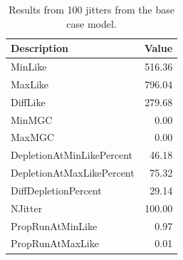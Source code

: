 \documentclass[12pt,]{article}
\begin{document}
\FloatBarrier

\begin{table}[ht]
\centering
\caption{Results from 100 jitters from the base 
                                      case model.} 
\label{tab:jitter}
\begin{tabular}{lr}
  \hline
Description & Value \\ 
  \hline
MinLike & 516.36 \\ 
  MaxLike & 796.04 \\ 
  DiffLike & 279.68 \\ 
  MinMGC & 0.00 \\ 
  MaxMGC & 0.00 \\ 
  DepletionAtMinLikePercent & 46.18 \\ 
  DepletionAtMaxLikePercent & 75.32 \\ 
  DiffDepletionPercent & 29.14 \\ 
  NJitter & 100.00 \\ 
  PropRunAtMinLike & 0.97 \\ 
  PropRunAtMaxLike & 0.01 \\ 
   \hline
\end{tabular}
\end{table}
\end{document}
